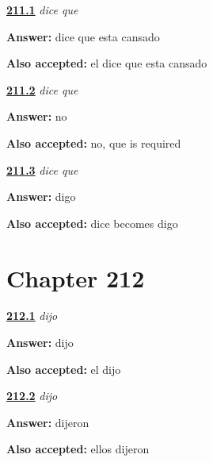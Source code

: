 \noindent\begin{minipage}[t]{\linewidth}
\raggedright
\hyperlink{review-ES-C57-dice-que-build}{\textbf{211.1}} \emph{dice que}\par
\small \textbf{Answer:} dice que esta cansado\par
\footnotesize \textbf{Also accepted:} el dice que esta cansado
\end{minipage}\par\medskip

\noindent\begin{minipage}[t]{\linewidth}
\raggedright
\hyperlink{review-ES-C57-dice-que-drop}{\textbf{211.2}} \emph{dice que}\par
\small \textbf{Answer:} no\par
\footnotesize \textbf{Also accepted:} no, que is required
\end{minipage}\par\medskip

\noindent\begin{minipage}[t]{\linewidth}
\raggedright
\hyperlink{review-ES-C57-dice-que-echo}{\textbf{211.3}} \emph{dice que}\par
\small \textbf{Answer:} digo\par
\footnotesize \textbf{Also accepted:} dice becomes digo
\end{minipage}\par\medskip

\section*{Chapter 212}

\noindent\begin{minipage}[t]{\linewidth}
\raggedright
\hyperlink{review-ES-C57-dijo-say}{\textbf{212.1}} \emph{dijo}\par
\small \textbf{Answer:} dijo\par
\footnotesize \textbf{Also accepted:} el dijo
\end{minipage}\par\medskip

\noindent\begin{minipage}[t]{\linewidth}
\raggedright
\hyperlink{review-ES-C57-dijo-plural}{\textbf{212.2}} \emph{dijo}\par
\small \textbf{Answer:} dijeron\par
\footnotesize \textbf{Also accepted:} ellos dijeron
\end{minipage}\par\medskip

